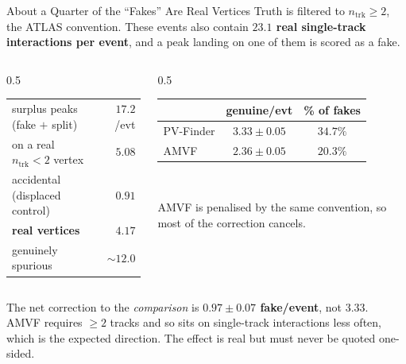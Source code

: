 \documentclass[xcolor=table,aspectratio=169]{beamer}
\newcommand{\ntrk}{\ensuremath{n_\mathrm{trk}}}
\begin{document}
\begin{frame}[shrink=15]{About a Quarter of the ``Fakes'' Are Real Vertices}
    \small
    Truth is filtered to $\ntrk\geq2$, the ATLAS convention. These events also
    contain \textbf{$23.1$ real single-track interactions per event}, and a peak
    landing on one of them is scored as a fake.

    \vspace{0.6em}
    \begin{columns}[t]
        \begin{column}{0.5\linewidth}
            \centering
            \footnotesize
            \begin{tabular}{lr}
                \toprule
                surplus peaks (fake $+$ split) & $17.2$/evt \\
                on a real $\ntrk\!<\!2$ vertex & $5.08$ \\
                accidental (displaced control) & $0.91$ \\
                \midrule
                \textbf{real vertices} & $\mathbf{4.17}$ \\
                genuinely spurious & ${\sim}12.0$ \\
                \bottomrule
            \end{tabular}
        \end{column}
        \begin{column}{0.5\linewidth}
            \centering
            \footnotesize
            \begin{tabular}{lcc}
                \toprule
                & genuine/evt & \% of fakes \\
                \midrule
                PV-Finder & $3.33 \pm 0.05$ & $34.7\%$ \\
                AMVF      & $2.36 \pm 0.05$ & $20.3\%$ \\
                \bottomrule
            \end{tabular}\\[0.5em]
            \raggedright
            AMVF is penalised by the same convention, so most of the correction
            cancels.
        \end{column}
    \end{columns}

    \vspace{0.7em}
    \centering
    The net correction to the \emph{comparison} is
    \textbf{$\mathbf{0.97 \pm 0.07}$ fake/event}, not $3.33$.\\[0.2em]
    {\footnotesize\textcolor{black!55}{AMVF requires $\geq2$ tracks and so sits on
    single-track interactions less often, which is the expected direction. The effect
    is real but must never be quoted one-sided.}}
\end{frame}
\end{document}
